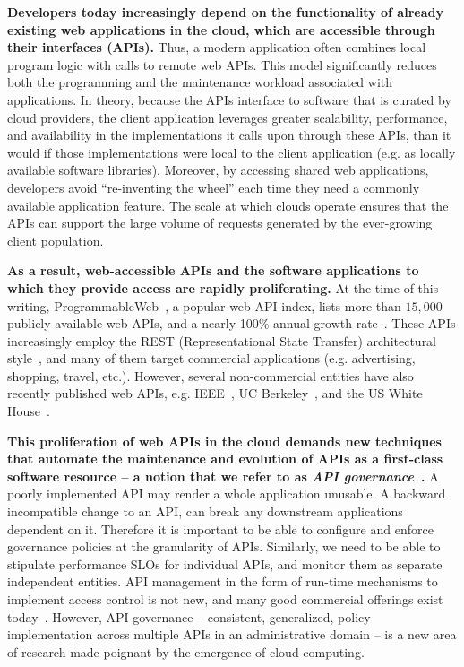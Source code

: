 \textbf{Developers today
increasingly depend on the functionality of already existing web applications in the cloud, which
are accessible through their interfaces (APIs).} Thus, a modern application 
often combines local program logic with calls to remote web APIs. 
This model significantly reduces both the programming and
the maintenance workload associated with applications. In theory, because
the APIs interface to software that is curated by cloud providers, the client
application leverages greater scalability, performance, 
and availability in the implementations it calls upon through these APIs, than
it would if those implementations were local to the client application
(e.g. as locally available software libraries).
Moreover, by accessing shared web applications, developers avoid ``re-inventing the
wheel'' each time they need a commonly available application feature. The scale at
which clouds operate ensures that the APIs can support the large volume
of requests generated by the ever-growing client population.

\textbf{As a result, web-accessible APIs and the software applications to which
they provide access are rapidly proliferating.} At the time of this writing, 
ProgrammableWeb~\cite{pweb}, a popular web API index, lists more than $15,000$
publicly available web APIs, and a nearly 100\% annual growth rate~\cite{pweb_growth}.
These APIs increasingly employ the REST (Representational State Transfer) architectural style~\cite{Fielding:2000:ASD:932295}, and 
many of them target commercial applications (e.g. advertising, shopping, travel, etc.).
However, several non-commercial entities have also recently published web 
APIs, e.g. IEEE~\cite{ieeeapis}, UC Berkeley~\cite{ucbapis}, and the US White
House~\cite{whitehouseapis}. 

\textbf{This proliferation of web APIs in the cloud demands new techniques that
automate the maintenance and evolution of APIs as a first-class software
resource -- a notion that we refer
to as \textit{API governance}~\cite{6903538}.} A poorly implemented API may render a whole application unusable.
A backward incompatible change to an API, can break any downstream applications dependent on it. 
Therefore it is important to be able to configure and enforce governance policies at the granularity of
APIs. Similarly, we need to be able to stipulate performance SLOs for individual APIs, and monitor
them as separate independent entities.
API management in the form of run-time mechanisms to implement
access control is not new, and many good commercial offerings exist today~\cite{3scale,apigee,layer7}.   
However, API governance -- consistent, generalized, policy
implementation across multiple APIs in an administrative domain --
is a new area of research made poignant by the emergence of cloud computing.